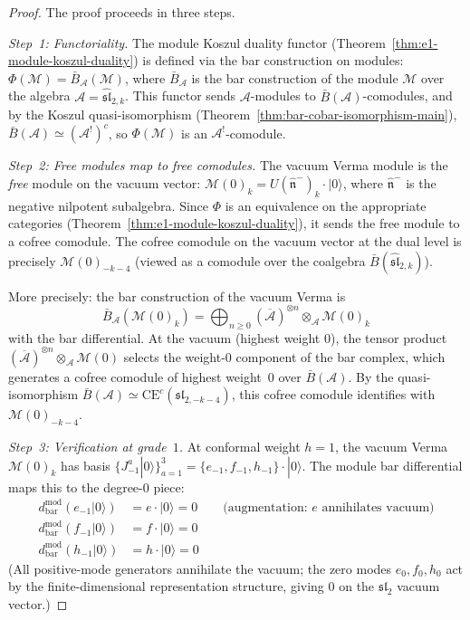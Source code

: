 \begin{proof}
The proof proceeds in three steps.

\emph{Step~1: Functoriality.}
The module Koszul duality functor
(Theorem~\ref{thm:e1-module-koszul-duality}) is defined via the
bar construction on modules:
$\Phi(\mathcal{M}) = \bar{B}_{\mathcal{A}}(\mathcal{M})$,
where $\bar{B}_{\mathcal{A}}$ is the bar construction of the module
$\mathcal{M}$ over the algebra $\mathcal{A} = \widehat{\mathfrak{sl}}_{2,k}$.
This functor sends $\mathcal{A}$-modules to
$\bar{B}(\mathcal{A})$-comodules, and by the Koszul quasi-isomorphism
(Theorem~\ref{thm:bar-cobar-isomorphism-main}),
$\bar{B}(\mathcal{A}) \simeq (\mathcal{A}^!)^c$,
so $\Phi(\mathcal{M})$ is an $\mathcal{A}^!$-comodule.

\emph{Step~2: Free modules map to free comodules.}
The vacuum Verma module is the \emph{free} module on the vacuum
vector:
$\mathcal{M}(0)_k = U(\widehat{\mathfrak{n}}^-)_k \cdot |0\rangle$,
where $\widehat{\mathfrak{n}}^-$ is the negative nilpotent subalgebra.
Since $\Phi$ is an equivalence on the appropriate categories
(Theorem~\ref{thm:e1-module-koszul-duality}), it sends the free
module to a cofree comodule.  The cofree comodule on the vacuum
vector at the dual level is precisely
$\mathcal{M}(0)_{-k-4}$ (viewed as a comodule over the coalgebra
$\bar{B}(\widehat{\mathfrak{sl}}_{2,k})$).

More precisely: the bar construction of the vacuum Verma is
\[
\bar{B}_{\mathcal{A}}(\mathcal{M}(0)_k)
= \bigoplus_{n \geq 0}
(\overline{\mathcal{A}})^{\otimes n} \otimes_{\mathcal{A}}
\mathcal{M}(0)_k
\]
with the bar differential.  At the vacuum (highest weight $0$),
the tensor product $(\overline{\mathcal{A}})^{\otimes n}
\otimes_{\mathcal{A}} \mathcal{M}(0)$ selects the weight-$0$
component of the bar complex, which generates a cofree comodule
of highest weight~$0$ over $\bar{B}(\mathcal{A})$.  By the
quasi-isomorphism $\bar{B}(\mathcal{A}) \simeq
\mathrm{CE}^c(\mathfrak{sl}_{2,-k-4})$, this cofree comodule
identifies with $\mathcal{M}(0)_{-k-4}$.

\emph{Step~3: Verification at grade~$1$.}
At conformal weight $h = 1$, the vacuum Verma
$\mathcal{M}(0)_k$ has basis
$\{J^a_{-1}|0\rangle\}_{a=1}^3 = \{e_{-1}, f_{-1}, h_{-1}\}
\cdot |0\rangle$.
The module bar differential maps this to the degree-$0$ piece:
\begin{align}
d_{\mathrm{bar}}^{\mathrm{mod}}(e_{-1}|0\rangle)
&= e \cdot |0\rangle = 0
\qquad \text{(augmentation: $e$ annihilates vacuum)} \\
d_{\mathrm{bar}}^{\mathrm{mod}}(f_{-1}|0\rangle)
&= f \cdot |0\rangle = 0 \\
d_{\mathrm{bar}}^{\mathrm{mod}}(h_{-1}|0\rangle)
&= h \cdot |0\rangle = 0
\end{align}
(All positive-mode generators annihilate the vacuum; the zero
modes $e_0, f_0, h_0$ act by the finite-dimensional
representation structure, giving $0$ on the $\mathfrak{sl}_2$
vacuum vector.)


\end{proof}
